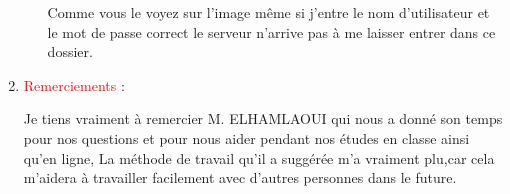 \documentclass{article}
\begin{document}
\begin{enumerate}
\begin{enumerate}
 \hspace*{-1.05in}
               \noindent{}
  
   \vspace{0.6cm}  
	\textcolor{red}{\huge \warning} Comme vous le voyez sur l'image même si j'entre le nom d'utilisateur et le mot de passe correct le serveur n'arrive pas à me laisser entrer dans ce dossier.  
  \end{enumerate}
  
 
  
  \vspace{3cm} 
\item  \textcolor{red}{\Huge Remerciements} :   
  \vspace{2cm} 
  
\setlength{\parindent}{1cm}  \huge	Je tiens vraiment à remercier M. ELHAMLAOUI qui nous a donné son temps pour nos questions
					\linebreak  et pour nous aider pendant nos études en classe
					\linebreak  ainsi qu'en ligne, La méthode de travail \linebreak qu'il a suggérée  m'a vraiment plu,\linebreak car cela  m'aidera à travailler  facilement avec \linebreak d'autres 
					  personnes dans le future.
  
  
  
\end{enumerate}
\end{document}
